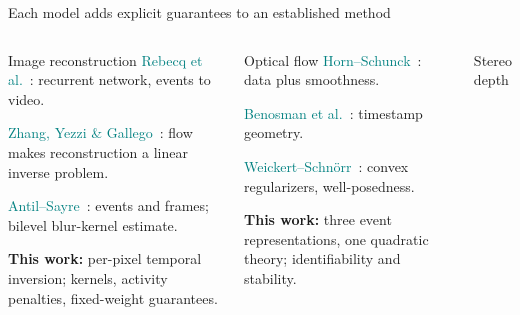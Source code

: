 \begin{frame}{Each model adds explicit guarantees to an established method}
\vspace*{-3mm}
\begin{columns}[T]
\begin{block}{Image reconstruction}
\footnotesize
\textcolor{teal}{Rebecq et al.}~\cite{rebecq2019events}: recurrent network, events to video.\par\smallskip
\textcolor{teal}{Zhang, Yezzi \& Gallego}~\cite{zhang2021formulating}: flow makes reconstruction a linear inverse problem.\par\smallskip
\textcolor{teal}{Antil--Sayre}~\cite{HAntil_DSayre_2023a}: events and frames; bilevel blur-kernel estimate.\par\smallskip
\textbf{This work:} per-pixel temporal inversion; kernels, activity penalties, fixed-weight guarantees.
\end{block}
\begin{block}{Optical flow}
\footnotesize
\textcolor{teal}{Horn--Schunck}~\cite{horn1981determining}: data plus smoothness.\par\smallskip
\textcolor{teal}{Benosman et al.}~\cite{benosman2014event}: timestamp geometry.\par\smallskip
\textcolor{teal}{Weickert--Schn\"orr}~\cite{weickert2001theoretical}: convex regularizers, well-posedness.\par\smallskip
\textbf{This work:} three event representations, one quadratic theory; identifiability and stability.
\end{block}
\begin{block}{Stereo depth}

\end{block}
\end{columns}
\end{frame}
